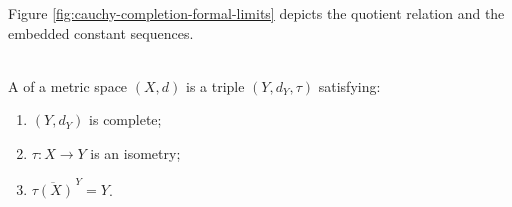 Figure \ref{fig:cauchy-completion-formal-limits} depicts the quotient relation and the embedded constant sequences.
\begin{illustrationfigure}[H]
  \centering
  
  \caption{Equivalent rational Cauchy sequences determine one formal limit, while constant sequences embed $\Q$.}
  \label{fig:cauchy-completion-formal-limits}
\end{illustrationfigure}

\begin{definition} \label{def:metric-completion} \\
A  of a metric space $(X,d)$ is a triple $(Y,d_Y,\tau)$ satisfying:
\begin{enumerate}[label=(\roman*)]
\setlength{\itemsep}{0pt}
\item $(Y,d_Y)$ is complete;
\item $\tau:X\to Y$ is an isometry;
\item $\overline{\tau(X)}^{\,Y}=Y$.
\end{enumerate}
\end{definition}

